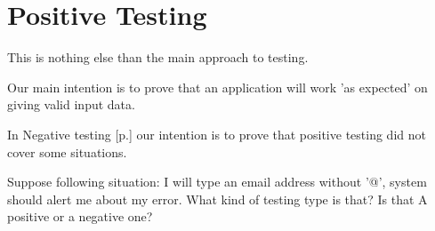 \section{Positive Testing}
\label{sec:Positive Testing}

This is nothing else than the main approach to testing.

Our main intention is to prove that an application will work 'as expected' on giving valid input data.

In Negative testing [p.\pageref{sec:Negative Testing}] our intention is to prove that positive testing did not cover some situations.

Suppose following situation: I will type an email address without '@', system should alert me about my error. What kind of testing type is that? Is that A positive or a negative one?
